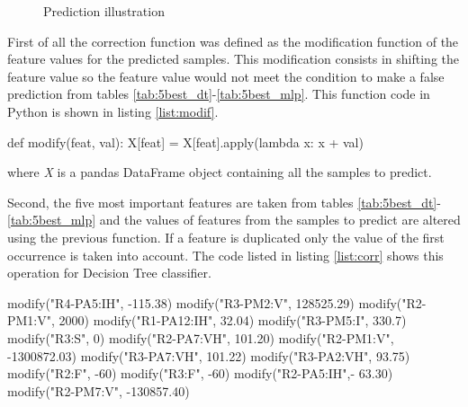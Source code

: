 \begin{figure}[H]
    \centering
    \caption{Prediction illustration} \label{fig:predict}
\end{figure}

First of all the correction function was defined as the modification function of the feature values for the predicted samples. This modification consists in shifting the feature value so the feature value would not meet the condition to make a false prediction from tables \ref{tab:5best_dt}-\ref{tab:5best_mlp}. This function code in Python is shown in listing \ref{list:modif}.
\begin{python}[caption = {Function used to bulk shift the values of a chosen feature by a given value}, label = list:modif]
def modify(feat, val):
    X[feat] = X[feat].apply(lambda x: x + val)
\end{python}
where \textit{X} is a pandas DataFrame object containing all the samples to predict.

Second, the five most important features are taken from tables \ref{tab:5best_dt}-\ref{tab:5best_mlp} and the values of features from the samples to predict are altered using the previous function. If a feature is duplicated only the value of the first occurrence is taken into account. The code listed in listing \ref{list:corr} shows this operation for Decision Tree classifier.

\begin{python}[caption = {Shifting the values of all the most important features using the condition values found using Lime}, label = list:corr]
modify("R4-PA5:IH", -115.38)
modify("R3-PM2:V", 128525.29)
modify("R2-PM1:V", 2000)
modify("R1-PA12:IH", 32.04)
modify("R3-PM5:I", 330.7)
modify("R3:S", 0)
modify("R2-PA7:VH", 101.20)
modify("R2-PM1:V", -1300872.03)
modify("R3-PA7:VH", 101.22)
modify("R3-PA2:VH", 93.75)    
modify("R2:F", -60)
modify("R3:F", -60)
modify("R2-PA5:IH",- 63.30)
modify("R2-PM7:V", -130857.40) 
\end{python}

